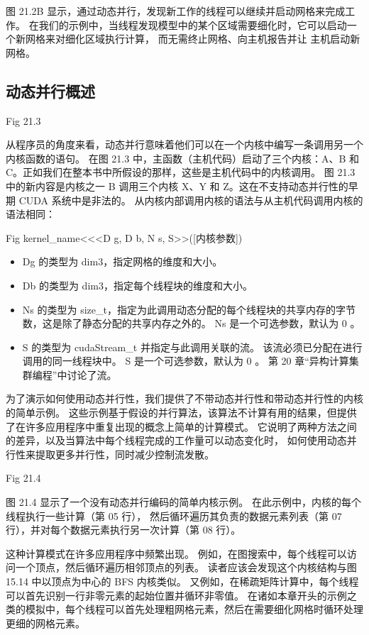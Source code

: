 图 21.2B 显示，通过动态并行，发现新工作的线程可以继续并启动网格来完成工作。 
在我们的示例中，当线程发现模型中的某个区域需要细化时，它可以启动一个新网格来对细化区域执行计算，
而无需终止网格、向主机报告并让 主机启动新网格。

\subsection{动态并行概述}
{\color{red} Fig 21.3}

从程序员的角度来看，动态并行意味着他们可以在一个内核中编写一条调用另一个内核函数的语句。 
在图 21.3 中，主函数（主机代码）启动了三个内核：A、B 和 C。正如我们在整本书中所假设的那样，这些是主机代码中的内核调用。 
图 21.3 中的新内容是内核之一 B 调用三个内核 X、Y 和 Z。这在不支持动态并行性的早期 CUDA 系统中是非法的。 
从内核内部调用内核的语法与从主机代码调用内核的语法相同：

{\color{red} Fig}
kernel\_name<<<D g, D b, N s, S>>([内核参数])

\begin{itemize}
   \item Dg 的类型为 dim3，指定网格的维度和大小。
   \item Db 的类型为 dim3，指定每个线程块的维度和大小。
   \item Ns 的类型为 size\_t，指定为此调用动态分配的每个线程块的共享内存的字节数，这是除了静态分配的共享内存之外的。 
   		Ns 是一个可选参数，默认为 0 。
   \item S 的类型为 cudaStream\_t 并指定与此调用关联的流。 该流必须已分配在进行调用的同一线程块中。 
   		S 是一个可选参数，默认为 0 。 第 20 章“异构计算集群编程”中讨论了流。
\end{itemize}

为了演示如何使用动态并行性，我们提供了不带动态并行性和带动态并行性的内核的简单示例。 
这些示例基于假设的并行算法，该算法不计算有用的结果，但提供了在许多应用程序中重复出现的概念上简单的计算模式。 
它说明了两种方法之间的差异，以及当算法中每个线程完成的工作量可以动态变化时，
如何使用动态并行性来提取更多并行性，同时减少控制流发散。

{\color{red} Fig 21.4}

图 21.4 显示了一个没有动态并行编码的简单内核示例。 在此示例中，内核的每个线程执行一些计算（第 05 行），
然后循环遍历其负责的数据元素列表（第 07 行），并对每个数据元素执行另一次计算（第 08 行）。

这种计算模式在许多应用程序中频繁出现。 例如，在图搜索中，每个线程可以访问一个顶点，然后循环遍历相邻顶点的列表。 
读者应该会发现这个内核结构与图 15.14 中以顶点为中心的 BFS 内核类似。 
又例如，在稀疏矩阵计算中，每个线程可以首先识别一行非零元素的起始位置并循环非零值。 
在诸如本章开头的示例之类的模拟中，每个线程可以首先处理粗网格元素，然后在需要细化网格时循环处理更细的网格元素。

